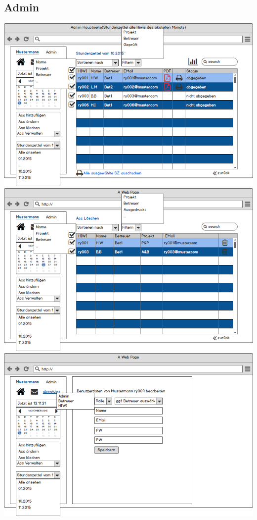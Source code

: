 \subsection{Admin}
\includegraphics[width=\linewidth]{UI/Admin/Hauptseite.png}
\includegraphics[width=\linewidth]{UI/Admin/Accounts/Ubersicht.png}
\includegraphics[width=\linewidth]{UI/Admin/Accounts/Bearbeiten.png}